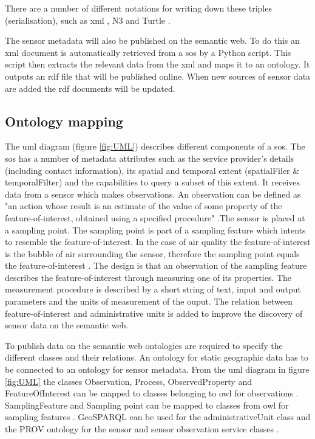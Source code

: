 There are a number of different notations for writing down these triples (serialisation), such as \ac{xml} \citep{LD:W3C3}, N3 \citep{LD:W3C5} and Turtle \citep{LD:W3C4}. 

The sensor metadata will also be published on the semantic web. To do this an \ac{xml} document is automatically retrieved from a \ac{sos} by a Python script. This script then extracts the relevant data from the \ac{xml} and maps it to an ontology. It outputs an \ac{rdf} file that will be published online. When new sources of sensor data are added the \ac{rdf} documents will be updated.   

\subsection{Ontology mapping}
The \ac{uml} diagram (figure \ref{fig:UML}) describes different components of a \ac{sos}. The \ac{sos} has a number of metadata attributes such as the service provider's details (including contact information), its spatial and temporal extent (spatialFiler \& temporalFilter) and the capabilities to query a subset of this extent. It receives data from a sensor which makes observations. An observation can be defined as "an action whose result is an estimate of the value of some property of the feature-of-interest, obtained using a specified procedure" \citep{SSW:Cox3}.The sensor is placed at a sampling point. The sampling point is part of a sampling feature which intents to resemble the feature-of-interest. In the case of air quality the feature-of-interest is the bubble of air surrounding the sensor, therefore the sampling point equals the feature-of-interest \citep{SDI:INSPIRE2}. The design is that an observation of the sampling feature describes the  feature-of-interest through measuring one of its properties. The measurement procedure is described by a short string of text, input and output parameters and the units of measurement of the ouput. The relation between feature-of-interest and administrative units is added to improve the discovery of sensor data on the semantic web. 

To publish data on the semantic web ontologies are required to specify the different classes and their relations. An ontology for static geographic data has to be connected to an ontology for sensor metadata. From the \ac{uml} diagram in figure \ref{fig:UML} the classes Observation, Process, ObservedProperty and FeatureOfInterest can be mapped to classes belonging to \ac{owl} for observations \citep{SSW:Cox}. SamplingFeature and Sampling point can be mapped to classes from \ac{owl} for sampling features \cite{SSW:Cox2}. GeoSPARQL can be used for the administrativeUnit class \citep{LD:OGC} and the PROV ontology for the sensor and sensor observation service classes \citep{LD:W3C2}. 

